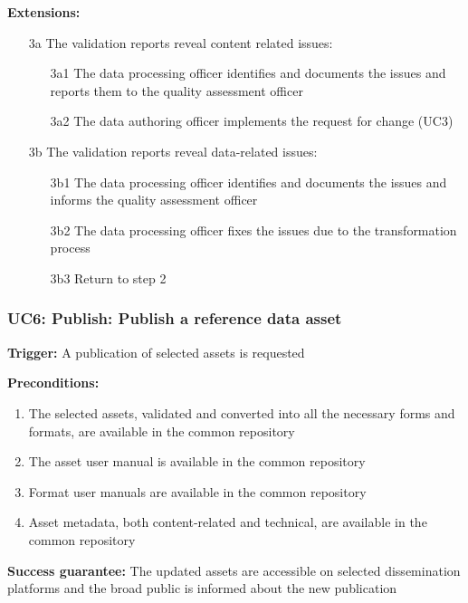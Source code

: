 	\textbf{Extensions:}
	\begin{enumerate}
		\item [3a] The validation reports reveal content related issues:
		\begin{enumerate}
			\item [3a1] The data processing officer identifies and documents the issues and reports them to the quality assessment officer
			\item [3a2] The data authoring officer implements the request for change (UC3)
		\end{enumerate}

		\item [3b] The validation reports reveal data-related issues:
		\begin{enumerate}
			\item [3b1] The data processing officer identifies and documents the issues and informs the quality assessment officer
			\item [3b2] The data processing officer fixes the issues due to the transformation process
			\item [3b3] Return to step 2
		\end{enumerate}		
	\end{enumerate}
	

	\subsubsection{UC6: Publish: Publish a reference data asset}
	\label{sec:uc6}		
	
	\textbf{Trigger:} A publication of selected assets is requested
	
	\textbf{Preconditions:} 
	\begin{enumerate}
		\item The selected assets, validated and converted into all the necessary forms and formats, are available in the common repository
		\item The asset user manual is available in the common repository
		\item Format user manuals are available in the common repository
		\item Asset metadata, both content-related and technical, are available in the common repository
	\end{enumerate}

	\textbf{Success guarantee:} The updated assets are accessible on selected dissemination platforms and the broad public is informed about the new publication

